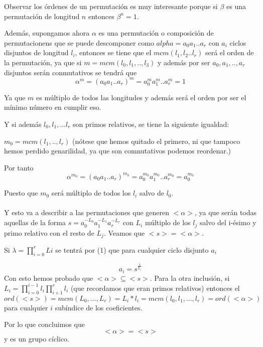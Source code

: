 \documentclass[12pt]{article}
\begin{document}
Observar los órdenes de un permutación es muy interesante porque si $\beta$ es una permutación
de longitud $n$ entonces $\beta^n = 1.$

Además, supongamos ahora  $\alpha$  es una permutación o composición de
permutacionens que se puede descomponer como $alpha = a_0 a_1 ..a_r$ con $a_i$ ciclos 
disjuntos de longitud $l_i$, entonces se tiene que el $mcm(l_1,l_2..l_r)$ será el orden de la permutación,
ya que si $m = mcm(l_0, l_1,..,l_3)$  y además por ser $a_0, a_1,..,a_r$ disjuntos serán conmutativos
  se tendrá que 
$$\alpha ^m = (a_0 a_1 ..a_r)^m = a_0^m a_1^m..a_r^m = 1$$

Ya que $m$ es múltiplo de todos las longitudes y además será el orden por ser el mínimo 
número en cumplir eso. 

Y si además $l_0,l_1,...l_r$ son primos relativos, se tiene la siguiente
igualdad: 

$m_0 = mcm(l_1,..,l_r)$ (nótese que hemos quitado el primero, ni que tampoco hemos perdido
genarilidad, ya que son comnutativos podemos reordenar.)

Por tanto 
\begin{equation}
    \alpha^{m_0} = (a_0 a_1 ..a_r)^{m_0} = a_0^{m_0} a_1^{m_0}..a_r^{m_0} = a_0^{m_0}
\end{equation}



Puesto que $m_0$ será múltiplo de todos los $l_i$ salvo de $l_0.$ \paragraph{}


Y esto va a describir a las permutaciones que generen $<\alpha>$, 
ya que serán todas aquellas de la forma $s = a_0^{-L_0} a_1^{-L_1} a_r^{-L_r}$
con $L_i$ múltiplo de los $l_j$ salvo del i-ésimo y primo relativo con el resto de $L_j.$
Veamos que $<s> = <\alpha>.$

Si $\lambda = \prod_{i=0}^r Li$ se tentrá por (1) que para cualquier ciclo disjunto $a_i$

$$ a_i = s^{\frac{\lambda}{L_i}}$$
Con esto hemos probado que $<\alpha> \subseteq <s>.$ Para la otra inclusión, si 
$L_i= \prod_{i=0}^{i-1} l_i \prod_{i+1}^r l_i$ (que recordamos que eran primos relativos)
entonces el 
$$ord(<s>)= mcm(L_0,..., L_r) = L_i*l_i = mcm(l_0, l_1,..., l_r) = ord(<\alpha>)$$
para cualquier $i$ subíndice de los coeficientes. 

Por lo que concluimos que $$<\alpha> = <s>$$ y es un grupo cíclico. 
\end{document}
